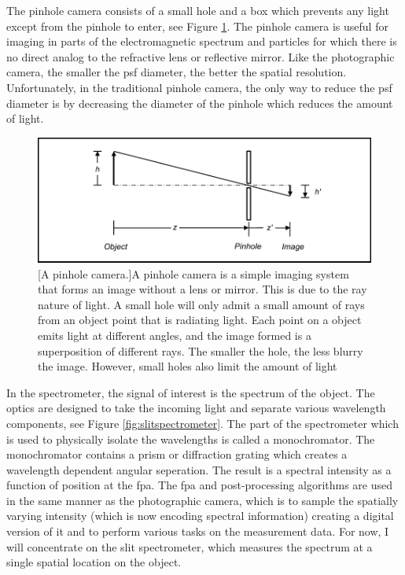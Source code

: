 The pinhole camera consists of a small hole and a box which prevents any light except from the pinhole to enter, see Figure \ref{fig:pinholecamera}. The pinhole camera is useful for imaging in parts of the electromagnetic spectrum and particles for which there is no direct analog to the refractive lens or reflective mirror. Like the photographic camera, the smaller the \gls{psf} diameter, the better the spatial resolution. Unfortunately, in the traditional pinhole camera, the only way to reduce the \gls{psf} diameter is by decreasing the diameter of the pinhole which reduces the amount of light.

\begin{figure}
    \includegraphics[scale=1]{pinholecamera}
    [A pinhole camera.]{A pinhole camera is a simple imaging system that forms an image without a lens or mirror. This is due to the ray nature of light. A small hole will only admit a small amount of rays from an object point that is radiating light. Each point on a object emits light at different angles, and the image formed is a superposition of different rays. The smaller the hole, the less blurry the image. However, small holes also limit the amount of light}
    \label{fig:pinholecamera}
\end{figure}

In the spectrometer, the signal of interest is the spectrum of the object. The optics are designed to take the incoming light and separate various wavelength components, see Figure \ref{fig:slitspectrometer}. The part of the spectrometer which is used to physically isolate the wavelengths is called a \gls{monochromator}. The monochromator contains a prism or diffraction grating which creates a wavelength dependent angular seperation. The result is a spectral intensity as a function of position at the \gls{fpa}. The \gls{fpa} and post-processing algorithms are used in the same manner as the photographic camera, which is to sample the spatially varying intensity (which is now encoding spectral information) creating a digital version of it and to perform various tasks on the measurement data. For now, I will concentrate on the slit spectrometer, which measures the spectrum at a single spatial location on the object.


